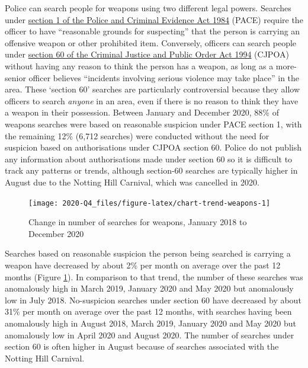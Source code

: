 \documentclass[
  a4paper,
  twoside, 11pt]{article}
\begin{document}
Police can search people for weapons using two different legal powers. Searches under \href{https://www.legislation.gov.uk/ukpga/1984/60/section/1}{section 1 of the Police and Criminal Evidence Act 1984} (PACE) require the officer to have ``reasonable grounds for suspecting'' that the person is carrying an offensive weapon or other prohibited item. Conversely, officers can search people under \href{https://www.legislation.gov.uk/ukpga/1994/33/section/60}{section 60 of the Criminal Justice and Public Order Act 1994} (CJPOA) without having any reason to think the person has a weapon, as long as a more-senior officer believes ``incidents involving serious violence may take place'' in the area. These `section 60' searches are particularly controversial because they allow officers to search \emph{anyone} in an area, even if there is no reason to think they have a weapon in their possession. Between January and December 2020, 88\% of weapons searches were based on reasonable suspicion under PACE section 1, with the remaining 12\% (6,712 searches) were conducted without the need for suspicion based on authorisations under CJPOA section 60. Police do not publish any information about authorisations made under section 60 so it is difficult to track any patterns or trends, although section-60 searches are typically higher in August due to the Notting Hill Carnival, which was cancelled in 2020.



\begin{figure}[tb]

{\centering \texttt{[image: 2020-Q4\_files/figure-latex/chart-trend-weapons-1]} 

}

\caption{Change in number of searches for weapons, January 2018 to December 2020}\label{fig:chart-trend-weapons}
\end{figure}

Searches based on reasonable suspicion the person being searched is carrying a weapon have decreased by about 2\% per month on average over the past 12 months (Figure \ref{fig:chart-trend-weapons}). In comparison to that trend, the number of these searches was anomalously high in March 2019, January 2020 and May 2020 but anomalously low in July 2018.
No-suspicion searches under section 60 have decreased by about 31\% per month on average over the past 12 months, with searches having been anomalously high in August 2018, March 2019, January 2020 and May 2020 but anomalously low in April 2020 and August 2020. The number of searches under section 60 is often higher in August because of searches associated with the Notting Hill Carnival.
\end{document}
